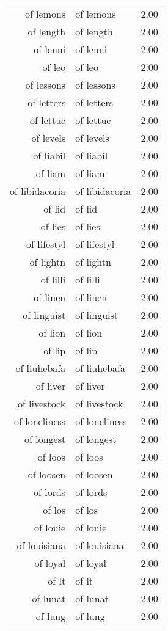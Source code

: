 \begin{table}[ht]
\begin{tabular}{rlr}
  of lemons & of lemons & 2.00 \\ 
  of length & of length & 2.00 \\ 
  of lenni & of lenni & 2.00 \\ 
  of leo & of leo & 2.00 \\ 
  of lessons & of lessons & 2.00 \\ 
  of letters & of letters & 2.00 \\ 
  of lettuc & of lettuc & 2.00 \\ 
  of levels & of levels & 2.00 \\ 
  of liabil & of liabil & 2.00 \\ 
  of liam & of liam & 2.00 \\ 
  of libidacoria & of libidacoria & 2.00 \\ 
  of lid & of lid & 2.00 \\ 
  of lies & of lies & 2.00 \\ 
  of lifestyl & of lifestyl & 2.00 \\ 
  of lightn & of lightn & 2.00 \\ 
  of lilli & of lilli & 2.00 \\ 
  of linen & of linen & 2.00 \\ 
  of linguist & of linguist & 2.00 \\ 
  of lion & of lion & 2.00 \\ 
  of lip & of lip & 2.00 \\ 
  of liuhebafa & of liuhebafa & 2.00 \\ 
  of liver & of liver & 2.00 \\ 
  of livestock & of livestock & 2.00 \\ 
  of loneliness & of loneliness & 2.00 \\ 
  of longest & of longest & 2.00 \\ 
  of loos & of loos & 2.00 \\ 
  of loosen & of loosen & 2.00 \\ 
  of lords & of lords & 2.00 \\ 
  of los & of los & 2.00 \\ 
  of louie & of louie & 2.00 \\ 
  of louisiana & of louisiana & 2.00 \\ 
  of loyal & of loyal & 2.00 \\ 
  of lt & of lt & 2.00 \\ 
  of lunat & of lunat & 2.00 \\ 
  of lung & of lung & 2.00 \\ 

\end{tabular}
\end{table}
